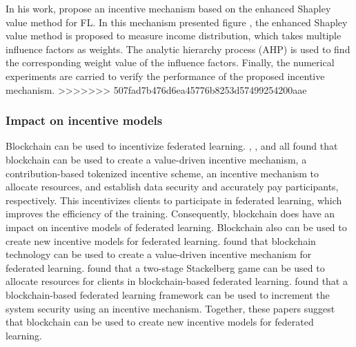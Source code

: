 \documentclass{article}
\begin{document}
\newline \newline In his work, \cite{Weijie_Tan} propose an incentive mechanism based on the enhanced Shapley value method for FL. In this mechanism presented figure \cite{fig:incentive_graph}, the enhanced Shapley value method is proposed to measure income distribution, which takes multiple influence factors as weights. The analytic hierarchy process (AHP) is used to find the corresponding weight value of the influence factors. Finally, the numerical experiments are carried to verify the performance of the proposed incentive mechanism. 
>>>>>>> 507fad7b476d6ea45776b8253d57499254200aae

\subsubsection{Impact on incentive models}
Blockchain can be used to incentivize federated learning. \cite{kumar_2020}, \cite{pandey_2022}, \cite{wang_2022} and \cite{martinez_record_2019} all found that blockchain can be used to create a value-driven incentive mechanism, a contribution-based tokenized incentive scheme, an incentive mechanism to allocate resources, and establish data security and accurately pay participants, respectively. This incentivizes clients to participate in federated learning, which improves the efficiency of the training. Consequently, blockchain does have an impact on incentive models of federated learning.\newline
Blockchain also can be used to create new incentive models for federated learning. \cite{kumar_2020} found that blockchain technology can be used to create a value-driven incentive mechanism for federated learning. \cite{wang_2022} found that a two-stage Stackelberg game can be used to allocate resources for clients in blockchain-based federated learning. \cite{goncalves_2022} found that a blockchain-based federated learning framework can be used to increment the system security using an incentive mechanism. Together, these papers suggest that blockchain can be used to create new incentive models for federated learning.


\end{document}
